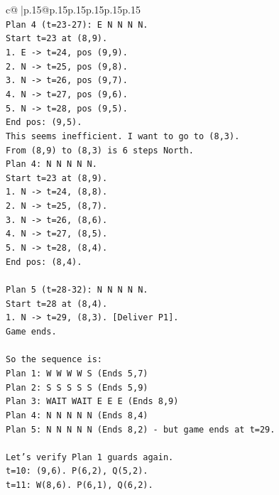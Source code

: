 \documentclass{article}
\begin{document}
{\begin{supertabular}{c@{$\;$}|p{.15\linewidth}@{}p{.15\linewidth}p{.15\linewidth}p{.15\linewidth}p{.15\linewidth}p{.15\linewidth}}
{{{\\ 
\texttt{Plan 4 (t=23{-}27): E N N N N.} \\
\texttt{Start t=23 at (8,9).} \\
\texttt{1. E {-}> t=24, pos (9,9).} \\
\texttt{2. N {-}> t=25, pos (9,8).} \\
\texttt{3. N {-}> t=26, pos (9,7).} \\
\texttt{4. N {-}> t=27, pos (9,6).} \\
\texttt{5. N {-}> t=28, pos (9,5).} \\
\texttt{End pos: (9,5).} \\
\texttt{This seems inefficient. I want to go to (8,3).} \\
\texttt{From (8,9) to (8,3) is 6 steps North.} \\
\texttt{Plan 4: N N N N N.} \\
\texttt{Start t=23 at (8,9).} \\
\texttt{1. N {-}> t=24, (8,8).} \\
\texttt{2. N {-}> t=25, (8,7).} \\
\texttt{3. N {-}> t=26, (8,6).} \\
\texttt{4. N {-}> t=27, (8,5).} \\
\texttt{5. N {-}> t=28, (8,4).} \\
\texttt{End pos: (8,4).} \\
\\ 
\texttt{Plan 5 (t=28{-}32): N N N N N.} \\
\texttt{Start t=28 at (8,4).} \\
\texttt{1. N {-}> t=29, (8,3). {[}Deliver P1{]}.} \\
\texttt{Game ends.} \\
\\ 
\texttt{So the sequence is:} \\
\texttt{Plan 1: W W W W S (Ends 5,7)} \\
\texttt{Plan 2: S S S S S (Ends 5,9)} \\
\texttt{Plan 3: WAIT WAIT E E E (Ends 8,9)} \\
\texttt{Plan 4: N N N N N (Ends 8,4)} \\
\texttt{Plan 5: N N N N N (Ends 8,2) {-} but game ends at t=29.} \\
\\ 
\texttt{Let's verify Plan 1 guards again.} \\
\texttt{t=10: (9,6). P(6,2), Q(5,2).} \\
\texttt{t=11: W(8,6). P(6,1), Q(6,2).} \\
}}}
\end{supertabular}}
\end{document}
